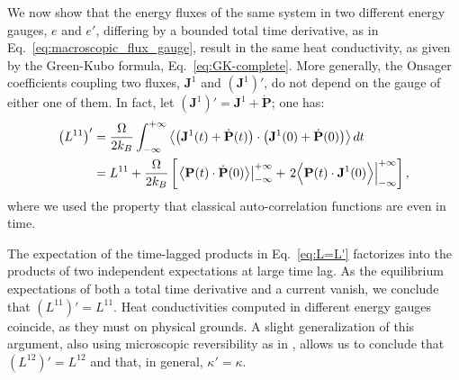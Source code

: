 We now show that the energy fluxes of the same system in two different energy gauges, $e$ and $e'$, differing by a bounded total time derivative, as in Eq.~\eqref{eq:macroscopic_flux_gauge}, result in the same heat conductivity, as given by the Green-Kubo formula, Eq.~\eqref{eq:GK-complete}. More generally, the Onsager coefficients coupling two fluxes, $\mathbf{J}^1$ and $\left(\mathbf{J}^1\right)'$, do not depend on the gauge of either one of them. In fact, let $\left(\mathbf{J}^1\right)' = \mathbf{J}^1 + \dot{\mathbf{P}}$; one has:
\begin{equation}
  \begin{aligned}
    \left (L^{11} \right)' &= \frac{\rOmega}{2 k_B }\int_{-\infty}^{+\infty} \left \langle \left (\mathbf{J}^1(t)+\dot{\mathbf{P}}(t) \right ) \cdot  \left (\mathbf{J}^1(0)+\dot{\mathbf{P}}(0)\right ) \right \rangle dt \\
    &= L^{11} + \frac{\rOmega}{2 k_B } \left[ \left .  \left \langle \mathbf{P}(t) \cdot \dot{\mathbf{P}}(0) \right \rangle \right |^{+\infty}_{-\infty} + \left .  2 \Bigl \langle \mathbf{P}(t) \cdot \mathbf{J}^1(0) \Bigr \rangle \right |^{+\infty}_{-\infty} \right] ,
  \end{aligned} \label{eq:L=L'}
\end{equation}
where we used the property that classical auto-correlation functions are even in time.

The expectation of the time-lagged products in Eq.~\eqref{eq:L=L'} factorizes into the products of two independent expectations at large time lag. As the equilibrium expectations of both a total time derivative and a current vanish, we conclude that $\left (L^{11}\right )'=L^{11}$. Heat conductivities computed in different energy gauges coincide, as they must on physical grounds. A slight generalization of this argument, also using microscopic reversibility as in \cite{Onsager1931a,Onsager1931b}, allows us to conclude that $\left (L^{12} \right )'=L^{12}$ and that, in general, $\kappa'=\kappa$.

